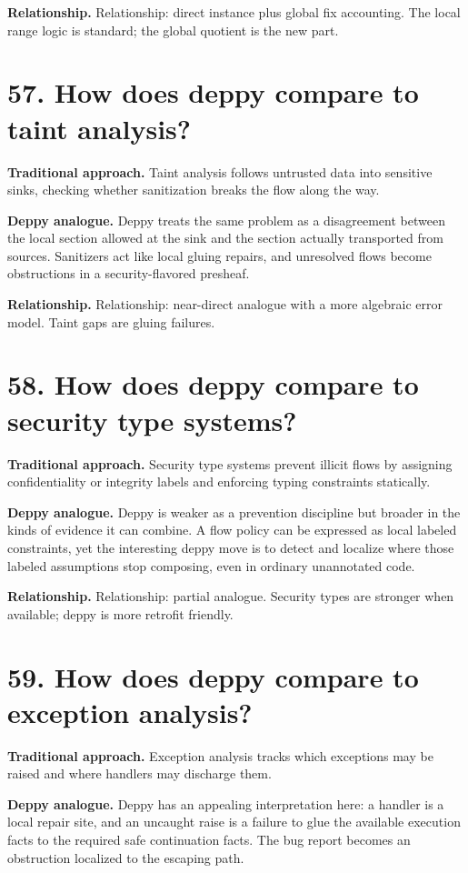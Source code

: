 \documentclass[11pt,openany]{book}
\begin{document}
\textbf{Relationship.} Relationship: direct instance plus global fix accounting. The local range logic is standard; the global quotient is the new part.

\section*{57. How does deppy compare to taint analysis?}
\textbf{Traditional approach.} Taint analysis follows untrusted data into sensitive sinks, checking whether sanitization breaks the flow along the way.

\textbf{Deppy analogue.} Deppy treats the same problem as a disagreement between the local section allowed at the sink and the section actually transported from sources. Sanitizers act like local gluing repairs, and unresolved flows become obstructions in a security-flavored presheaf.

\textbf{Relationship.} Relationship: near-direct analogue with a more algebraic error model. Taint gaps are gluing failures.

\section*{58. How does deppy compare to security type systems?}
\textbf{Traditional approach.} Security type systems prevent illicit flows by assigning confidentiality or integrity labels and enforcing typing constraints statically.

\textbf{Deppy analogue.} Deppy is weaker as a prevention discipline but broader in the kinds of evidence it can combine. A flow policy can be expressed as local labeled constraints, yet the interesting deppy move is to detect and localize where those labeled assumptions stop composing, even in ordinary unannotated code.

\textbf{Relationship.} Relationship: partial analogue. Security types are stronger when available; deppy is more retrofit friendly.

\section*{59. How does deppy compare to exception analysis?}
\textbf{Traditional approach.} Exception analysis tracks which exceptions may be raised and where handlers may discharge them.

\textbf{Deppy analogue.} Deppy has an appealing interpretation here: a handler is a local repair site, and an uncaught raise is a failure to glue the available execution facts to the required safe continuation facts. The bug report becomes an obstruction localized to the escaping path.
\end{document}
